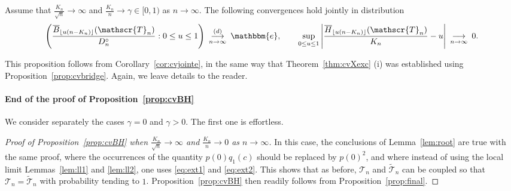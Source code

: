 \documentclass[10pt]{amsart}
\theoremstyle{definition}\newtheorem{defi}[theo]{Definition}\newtheorem{rema}[theo]{Remark}\newtheorem{exam}[theo]{Example}\newtheorem{exem}[theo]{Example}\newtheorem{nota}[theo]{Notation}
\def\Dcn{D^{\circ}_{n}}
\def\oB{\overline{B}}
\def\oH{\overline{H}}
\def\tTs{\tilde{\Ts}}
\def\Ts{\mathscr{T}}
\begin{document}
\begin{proposition}
\label{prop:final}
Assume that $\frac{K_{n}}{\sqrt{n}} \rightarrow   \infty$ and   $\tfrac{K_{n}}{n}  \rightarrow \gamma \in [0,1)$ as $n \rightarrow \infty$. The following convergences hold jointly in distribution \[  \left(  \frac{\oB_{\lfloor u (n-K_{n}) \rfloor}(\Ts_{n})}{ \Dcn} : 0\leq u \leq 1\right)  \ \mathop{\longrightarrow}^{(d)}_{n \rightarrow \infty} \ \mathbbm{e}, \qquad  \sup_{0 \leq u \leq 1} \left|   \frac{\oH_{ \lfloor u (n-K_{n}) \rfloor  }(\Ts_{n})}{K_{n}}-u\right|  \ \mathop{\longrightarrow}_{n \rightarrow \infty} \ 0.\]
\end{proposition}
This proposition follows from Corollary~\ref{cor:cvjointe},
in the same way that Theorem~\ref{thm:cvXexc} (i) was established using Proposition~\ref{prop:cvbridge}.
Again, we leave details to the reader.


\medskip

\paragraph*{End of the proof of Proposition~\ref{prop:cvBH}}

We consider separately the cases $\gamma=0$ and $\gamma>0$.
The first one is effortless.

\begin{proof}[Proof of Proposition~\ref{prop:cvBH} when  $\tfrac{K_{n}}{\sqrt{n}} \rightarrow \infty$ and $ \tfrac{K_{n}}{n}  \rightarrow 0$ as $n \rightarrow \infty$] In this case, the conclusions of Lemma~\ref{lem:root} are true with the same proof, where the occurrences of the quantity $p(0) q_{1}(c)$ should be replaced by $p(0)^{2}$, and where instead of using the local limit Lemmas~\ref{lem:ll1} and \ref{lem:ll2}, one uses \eqref{eq:ext1} and \eqref{eq:ext2}.  This shows that as before,   $\Ts_{n}$ and $\tTs _{n}$ can be coupled so that $\Ts_{n}=\tTs_{n}$ with probability tending to $1$.  Proposition~\ref{prop:cvBH} then readily follows from Proposition~\ref{prop:final}.
\end{proof}
\end{document}
